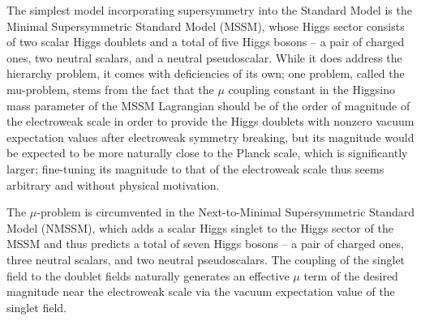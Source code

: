 The simplest model incorporating supersymmetry into the Standard Model is the Minimal Supersymmetric Standard Model (MSSM), whose Higgs sector consists of two scalar Higgs doublets and a total of five Higgs bosons -- a pair of charged ones, two neutral scalars, and a neutral pseudoscalar. While it does address the hierarchy problem, it comes with deficiencies of its own; one problem, called the mu-problem, stems from the fact that the $\mu$ coupling constant in the Higgsino mass parameter of the MSSM Lagrangian should be of the order of magnitude of the electroweak scale in order to provide the Higgs doublets with nonzero vacuum expectation values after electroweak symmetry breaking, but its magnitude would be expected to be more naturally close to the Planck scale, which is significantly larger; fine-tuning its magnitude to that of the electroweak scale thus seems arbitrary and without physical motivation.

The $\mu$-problem is circumvented in the Next-to-Minimal Supersymmetric Standard Model (NMSSM), which adds a scalar Higgs singlet to the Higgs sector of the MSSM and thus predicts a total of seven Higgs bosons -- a pair of charged ones, three neutral scalars, and two neutral pseudoscalars. The coupling of the singlet field to the doublet fields naturally generates an effective $\mu$ term of the desired magnitude near the electroweak scale via the vacuum expectation value of the singlet field.